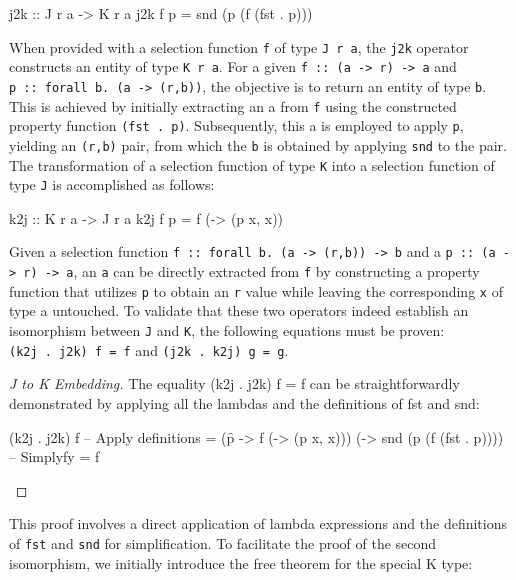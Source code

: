 \documentclass[runningheads]{llncs}
\begin{document}
\begin{code}
j2k :: J r a -> K r a
j2k f p = snd (p (f (fst . p)))
\end{code}

When provided with a selection function \texttt{f} of type
\texttt{J\ r\ a}, the \texttt{j2k} operator constructs an entity of type
\texttt{K\ r\ a}. For a given
\texttt{f\ ::\ (a\ -\textgreater{}\ r)\ -\textgreater{}\ a} and
\texttt{p\ ::\ forall\ b.\ (a\ -\textgreater{}\ (r,b))}, the objective
is to return an entity of type \texttt{b}. This is achieved by initially
extracting an a from \texttt{f} using the constructed property function
\texttt{(fst\ .\ p)}. Subsequently, this a is employed to apply
\texttt{p}, yielding an \texttt{(r,b)} pair, from which the \texttt{b}
is obtained by applying \texttt{snd} to the pair. The transformation of
a selection function of type \texttt{K} into a selection function of
type \texttt{J} is accomplished as follows:

\begin{code}
k2j :: K r a -> J r a
k2j f p = f (\x -> (p x, x)) 
\end{code}

Given a selection function
\texttt{f\ ::\ forall\ b.\ (a\ -\textgreater{}\ (r,b))\ -\textgreater{}\ b}
and a \texttt{p\ ::\ (a\ -\textgreater{}\ r)\ -\textgreater{}\ a}, an
\texttt{a} can be directly extracted from \texttt{f} by constructing a
property function that utilizes \texttt{p} to obtain an \texttt{r} value
while leaving the corresponding \texttt{x} of type a untouched. To
validate that these two operators indeed establish an isomorphism
between \texttt{J} and \texttt{K}, the following equations must be
proven: \texttt{(k2j\ .\ j2k)\ f\ =\ f} and
\texttt{(j2k\ .\ k2j)\ g\ =\ g}.

\begin{proof}[J to K Embedding]
The equality (k2j . j2k) f = f can be straightforwardly demonstrated by applying all the 
lambdas and the definitions of fst and snd:

\begin{haskell}
(k2j . j2k) f
-- {{ Apply definitions}}
= (\f p -> f (\x -> (p x, x))) (\p -> snd (p (f (fst . p))))
-- {{ Simplyfy }}
= f
\end{haskell}

\end{proof}

This proof involves a direct application of lambda expressions and the
definitions of \texttt{fst} and \texttt{snd} for simplification. To
facilitate the proof of the second isomorphism, we initially introduce
the free theorem for the special K type:
\end{document}
